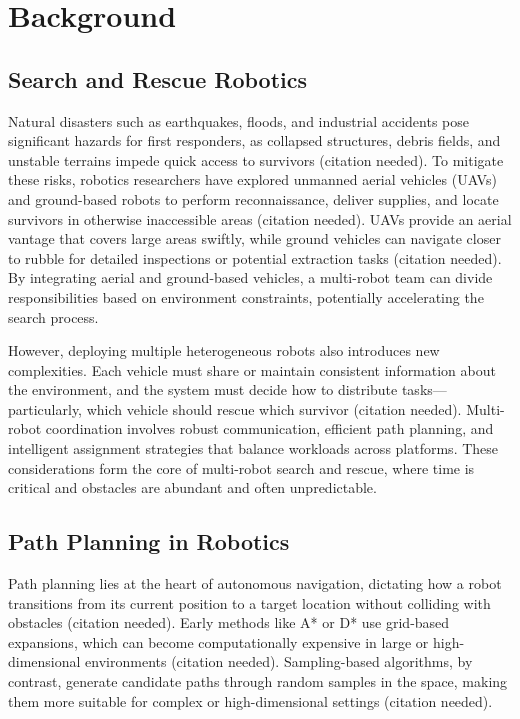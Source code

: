 \documentclass[12pt,a4paper]{report}
\begin{document}
\chapter{Background}
\label{cha:background}

\section{Search and Rescue Robotics}
\label{sec:search_rescue_robotics}
Natural disasters such as earthquakes, floods, and industrial accidents pose significant hazards 
for first responders, as collapsed structures, debris fields, and unstable terrains impede quick 
access to survivors (citation needed). To mitigate these risks, robotics researchers have explored 
unmanned aerial vehicles (UAVs) and ground-based robots to perform reconnaissance, deliver supplies, 
and locate survivors in otherwise inaccessible areas (citation needed). UAVs provide an aerial vantage 
that covers large areas swiftly, while ground vehicles can navigate closer to rubble for detailed 
inspections or potential extraction tasks (citation needed). By integrating aerial and ground-based 
vehicles, a multi-robot team can divide responsibilities based on environment constraints, 
potentially accelerating the search process.

However, deploying multiple heterogeneous robots also introduces new complexities. Each vehicle must 
share or maintain consistent information about the environment, and the system must decide how to 
distribute tasks—particularly, which vehicle should rescue which survivor (citation needed). 
Multi-robot coordination involves robust communication, efficient path planning, and 
intelligent assignment strategies that balance workloads across platforms. These considerations 
form the core of multi-robot search and rescue, where time is critical and obstacles are abundant 
and often unpredictable.

\section{Path Planning in Robotics}
\label{sec:path_planning_robotics}
Path planning lies at the heart of autonomous navigation, dictating how a robot transitions from its 
current position to a target location without colliding with obstacles (citation needed). Early methods 
like A* or D* use grid-based expansions, which can become computationally expensive in large or 
high-dimensional environments (citation needed). Sampling-based algorithms, by contrast, generate 
candidate paths through random samples in the space, making them more suitable for complex or 
high-dimensional settings (citation needed).
\end{document}
